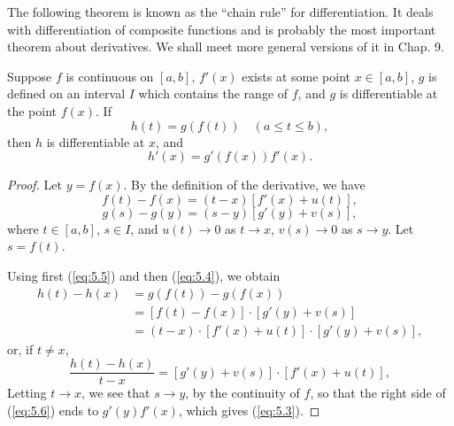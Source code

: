 The following theorem is known as the ``chain rule'' for differentiation. 
It deals with differentiation of composite functions 
and is probably the most important theorem about derivatives. 
We shall meet more general versions of it in Chap. 9.
\begin{thm}
    \label{thm:5.5}
    Suppose $f$ is continuous on $[a, b]$,
    $f'(x)$ exists at some point $x \in [a, b]$, 
    $g$ is defined on an interval $I$ which contains the range of $f$, 
    and $g$ is differentiable at the point $f(x)$. If
    \begin{equation*}
        h(t) = g(f(t))
        \quad
        (a \leq t \leq b),
    \end{equation*}
    then $h$ is differentiable at $x$, and 
    \begin{equation}
        \label{eq:5.3}
        h'(x) = g'(f(x))f'(x).
    \end{equation}
\end{thm}

\begin{proof}
    Let $y = f(x)$. By the definition of the derivative, we have
    \begin{equation}
        \label{eq:5.4}
        f(t) - f(x) = (t - x) \left[ f'(x) + u(t) \right],
    \end{equation}
    \begin{equation}
        \label{eq:5.5}
        g(s) - g(y) = (s - y) \left[ g'(y) + v(s) \right],
    \end{equation}
    where $t \in [a, b]$, $s \in I$, and $u(t) \rightarrow 0$ as $t \rightarrow x$, $v(s) \rightarrow 0$ as $s \rightarrow y$.
    Let $s = f(t)$.
    
    Using first (\ref{eq:5.5}) and then (\ref{eq:5.4}), we obtain 
    \begin{align*}
        h(t) - h(x)
        &= g(f(t)) - g(f(x)) \\
        &= \left[ f(t) - f(x) \right] \cdot \left[ g'(y) + v(s) \right] \\
        &= (t - x)\cdot \left[ f'(x) + u(t) \right]\cdot \left[ g'(y) + v(s) \right],
    \end{align*}
    or, if $t \neq x$,
    \begin{equation}
        \label{eq:5.6}
        \frac{h(t) - h(x)}{t - x} =
        \left[ g'(y) + v(s) \right]\cdot
        \left[ f'(x) + u(t) \right],
    \end{equation}
    Letting $t \rightarrow x$, we see that $s \rightarrow y$, 
    by the continuity of $f$, so that the right side of (\ref{eq:5.6}) ends to $g'(y)f'(x)$, which gives (\ref{eq:5.3}).
\end{proof}

